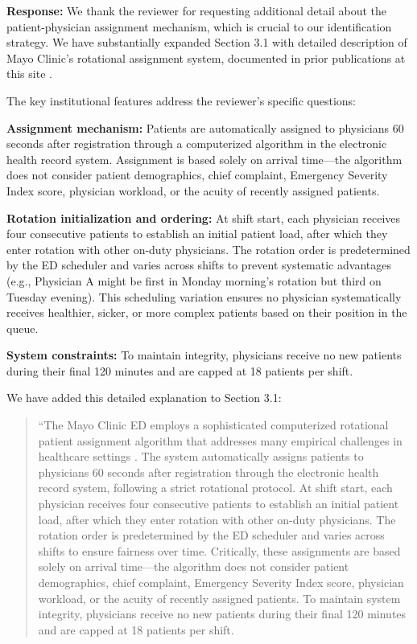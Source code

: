 \documentclass[11pt]{article}
\newcommand{\1}{\hbox{\rm 1\kern-.35em 1}}
\begin{document}
{\noindent\textbf{Response:} \color{blue}We thank the reviewer for requesting additional detail about the patient-physician assignment mechanism, which is crucial to our identification strategy. We have substantially expanded Section 3.1 with detailed description of Mayo Clinic's rotational assignment system, documented in prior publications at this site \cite{Traub2016; traub2016emergency; Traub2018}. 

The key institutional features address the reviewer's specific questions:

\textbf{Assignment mechanism:} Patients are automatically assigned to physicians 60 seconds after registration through a computerized algorithm in the electronic health record system. Assignment is based solely on arrival time—the algorithm does not consider patient demographics, chief complaint, Emergency Severity Index score, physician workload, or the acuity of recently assigned patients.

\textbf{Rotation initialization and ordering:} At shift start, each physician receives four consecutive patients to establish an initial patient load, after which they enter rotation with other on-duty physicians. The rotation order is predetermined by the ED scheduler and varies across shifts to prevent systematic advantages (e.g., Physician A might be first in Monday morning's rotation but third on Tuesday evening). This scheduling variation ensures no physician systematically receives healthier, sicker, or more complex patients based on their position in the queue.

\textbf{System constraints:} To maintain integrity, physicians receive no new patients during their final 120 minutes and are capped at 18 patients per shift.

We have added this detailed explanation to Section 3.1:

\begin{quote}
``The Mayo Clinic ED employs a sophisticated computerized rotational patient assignment algorithm that addresses many empirical challenges in healthcare settings \citep{Traub2016; traub2016emergency; Traub2018}. The system automatically assigns patients to physicians 60 seconds after registration through the electronic health record system, following a strict rotational protocol. At shift start, each physician receives four consecutive patients to establish an initial patient load, after which they enter rotation with other on-duty physicians. The rotation order is predetermined by the ED scheduler and varies across shifts to ensure fairness over time. Critically, these assignments are based solely on arrival time—the algorithm does not consider patient demographics, chief complaint, Emergency Severity Index score, physician workload, or the acuity of recently assigned patients. To maintain system integrity, physicians receive no new patients during their final 120 minutes and are capped at 18 patients per shift.


\end{quote}}
\end{document}
